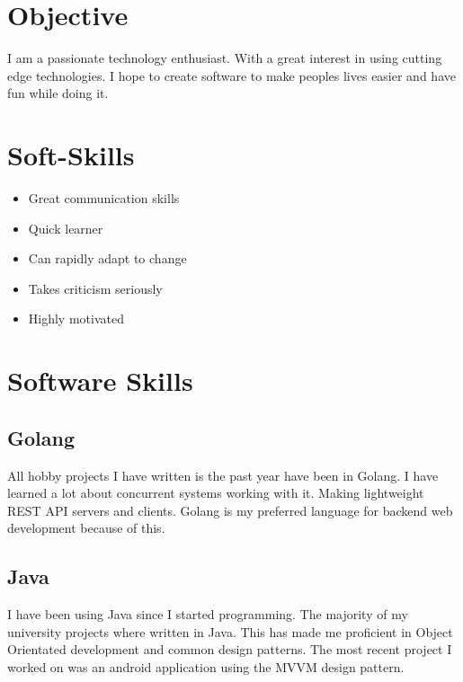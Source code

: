 \documentclass[a4paper]{cv}
\begin{document}
\section{Objective}
\begin{flushleft}
I am a passionate technology enthusiast. With a great interest in using cutting edge technologies. 
I hope to create software to make peoples lives easier and have fun while doing it.
\end{flushleft}
\begin{minipage}[t]{0.33\textwidth}
\section{Soft-Skills}
\begin{itemize}
\item Great communication skills
\item Quick learner
\item Can rapidly adapt to change
\item Takes criticism seriously
\item Highly motivated
\end{itemize}

\section{Software Skills}
\subsection{Golang}
\begin{flushleft}
All hobby projects I have written is the past year have been in Golang. I have learned a lot about concurrent systems working with it. Making lightweight REST API servers and clients. Golang is my preferred language for backend web development because of this.
\end{flushleft}
\sectionspace

\subsection{Java}
\begin{flushleft}
I have been using Java since I started programming. The majority of my university projects where written in Java. This has made me proficient in Object Orientated development and common design patterns. The most recent project I worked on was an android application using the MVVM design pattern.
\end{flushleft}


\end{minipage}
\end{document}
